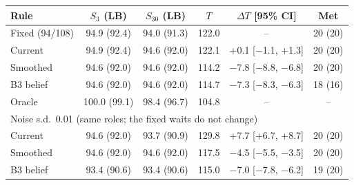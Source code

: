 \begin{tabular}{lccccc}
\toprule
Rule & $S_3$ (LB) & $S_{30}$ (LB) & $T$ & $\Delta T$ [95\% CI] & Met \\
\midrule
Fixed (94/108) & 94.9 (92.4) & 94.0 (91.3) & 122.0 & -- & 20 (20) \\
Current & 94.9 (92.4) & 94.6 (92.0) & 122.1 & +0.1 [$-$1.1, +1.3] & 20 (20) \\
Smoothed & 94.6 (92.0) & 94.6 (92.0) & 114.2 & $-$7.8 [$-$8.8, $-$6.8] & 20 (20) \\
B3 belief & 94.6 (92.0) & 94.6 (92.0) & 114.7 & $-$7.3 [$-$8.3, $-$6.3] & 18 (16) \\
Oracle & 100.0 (99.1) & 98.4 (96.7) & 104.8 & -- & -- \\
\midrule
\multicolumn{6}{l}{Noise s.d.\ 0.01 (same roles; the fixed waits do not change)} \\
Current & 94.6 (92.0) & 93.7 (90.9) & 129.8 & +7.7 [+6.7, +8.7] & 20 (20) \\
Smoothed & 94.6 (92.0) & 94.6 (92.0) & 117.5 & $-$4.5 [$-$5.5, $-$3.5] & 20 (20) \\
B3 belief & 93.4 (90.6) & 93.4 (90.6) & 115.0 & $-$7.0 [$-$7.8, $-$6.2] & 19 (20) \\
\bottomrule
\end{tabular}

